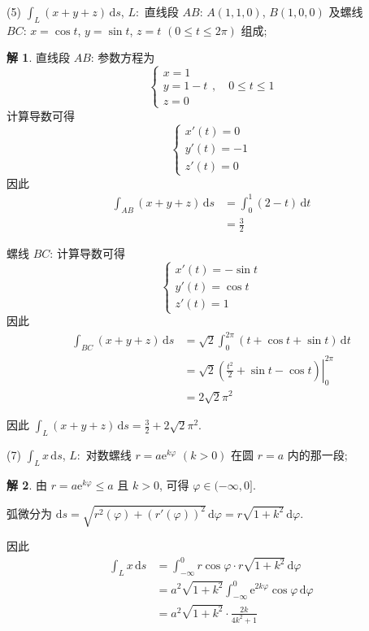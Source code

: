 \documentclass[a4paper,12pt]{article}
\theoremstyle{definition}
\newtheorem*{sol}{解}
\begin{document}
(5) $\int_L (x + y + z) \, \mathrm{d}s$, $L:$ 直线段 $AB:\,A(1,1,0)$, $B(1,0,0)$ 及螺线 $BC:\,x = \cos t$, $y = \sin t$, $z = t$ $(0 \leq t \leq 2\pi)$ 组成;
\begin{sol}
    直线段 $AB$: 参数方程为
    $$
        \begin{cases}
            x = 1     \\
            y = 1 - t \\
            z = 0
        \end{cases}, \quad 0 \leq t \leq 1
    $$
    计算导数可得
    $$
        \begin{cases}
            x'(t) = 0  \\
            y'(t) = -1 \\
            z'(t) = 0
        \end{cases}
    $$
    因此
    \begin{align*}
        \int_{AB} (x + y + z) \, \mathrm{d}s
         & = \int_0^1 (2 - t) \, \mathrm{d}t \\
         & = \frac{3}{2}
    \end{align*}

    螺线 $BC$: 计算导数可得
    $$
        \begin{cases}
            x'(t) = -\sin t \\
            y'(t) = \cos t  \\
            z'(t) = 1
        \end{cases}
    $$
    因此
    \begin{align*}
        \int_{BC} (x + y + z) \, \mathrm{d}s
         & = \sqrt{2} \int_0^{2\pi} (t + \cos t + \sin t) \, \mathrm{d}t                     \\
         & = \sqrt{2} \left. \left( \frac{t^2}{2} + \sin t - \cos t \right) \right|_0^{2\pi} \\
         & = 2\sqrt{2}\pi^2
    \end{align*}

    因此 $\int_L (x + y + z) \, \mathrm{d}s = \frac{3}{2} + 2\sqrt{2}\pi^2$.
\end{sol}
(7) $\int_L x \, \mathrm{d}s$, $L:$ 对数螺线 $r = a\mathrm{e}^{k\varphi}$ $(k > 0)$ 在圆 $r = a$ 内的那一段;
\begin{sol}
    由 $r = a\mathrm{e}^{k\varphi} \leq a$ 且 $k > 0$, 可得 $\varphi \in (-\infty, 0]$.

    弧微分为 $\mathrm{d}s = \sqrt{r^2(\varphi) + (r'(\varphi))^2} \, \mathrm{d}\varphi = r\sqrt{1 + k^2} \, \mathrm{d}\varphi$.

    因此
    \begin{align*}
        \int_L x \, \mathrm{d}s
         & = \int_{-\infty}^0 r\cos\varphi \cdot r\sqrt{1 + k^2} \, \mathrm{d}\varphi                  \\
         & = a^2\sqrt{1 + k^2} \int_{-\infty}^0 \mathrm{e}^{2k\varphi}\cos\varphi \, \mathrm{d}\varphi \\
         & = a^2\sqrt{1 + k^2} \cdot \frac{2k}{4k^2 + 1}
    \end{align*}
\end{sol}
\end{document}
